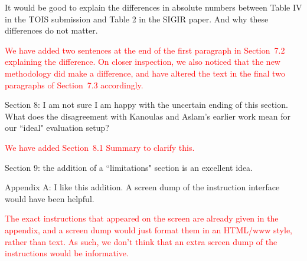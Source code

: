 \documentclass[a4paper]{article}
\newcommand{\comment}[1]{\vspace{1em} \textcolor{red}{{#1}} \vspace{1em}}
\begin{document}
It would be good to explain the differences in absolute
numbers between Table IV in the TOIS submission and Table 2 in the
SIGIR paper. And why these differences do not matter.

\comment {We have added two sentences at the end of the first paragraph in Section~7.2 
explaining the difference. On closer inspection, we also noticed that the new methodology did make a
difference, and have altered the text in the final two paragraphs of Section~7.3 accordingly.}

Section 8: I am not sure I am happy with the uncertain ending of
this section. What does the disagreement with Kanoulas and Aslam's
earlier work mean for our ``ideal" evaluation setup?

\comment{We have added Section~8.1 Summary to clarify this.}

Section 9: the addition of a ``limitations" section is an excellent
idea.

Appendix A: I like this addition. A screen dump of the instruction
interface would have been helpful.

\comment{The exact instructions that appeared on the screen are already
given in the appendix, and a screen dump would just format them in an
HTML/www style, rather than text.
As such, we don't think that an extra screen dump of the instructions
would be informative.
} 
\end{document}

